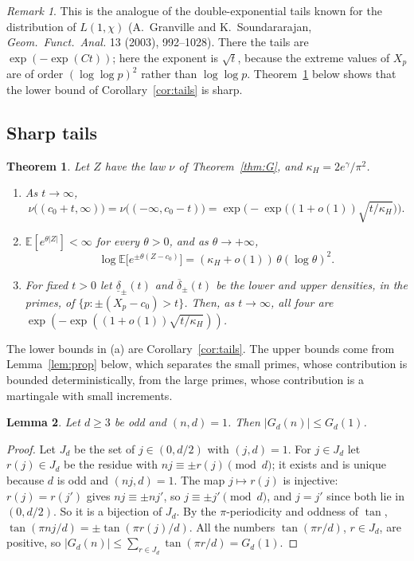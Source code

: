 \documentclass[11pt]{amsart}
\newtheorem{theorem}{Theorem}
\newtheorem{lemma}{Lemma}[section]
\theoremstyle{remark}
\newtheorem{remark}[lemma]{Remark}
\newcommand{\E}{\mathbb{E}}
\begin{document}
\begin{remark}
This is the analogue of the double-exponential tails known for the distribution of $L(1,\chi)$ (A.~Granville and K.~Soundararajan, \emph{Geom.\ Funct.\ Anal.} 13 (2003), 992--1028). There the tails are $\exp(-\exp(Ct))$; here the exponent is $\sqrt t$, because the extreme values of $X_p$ are of order $(\log\log p)^2$ rather than $\log\log p$. Theorem~\ref{thm:I} below shows that the lower bound of Corollary~\ref{cor:tails} is sharp.
\end{remark}

\subsection{Sharp tails}

\begin{theorem}\label{thm:I}
Let $Z$ have the law $\nu$ of Theorem~\ref{thm:G}, and $\kappa_H=2e^\gamma/\pi^2$.
\begin{enumerate}
\item[(a)] As $t\to\infty$,
\[
\nu\big((c_0+t,\infty)\big)=\nu\big((-\infty,c_0-t)\big)=\exp\Big(-\exp\big((1+o(1))\sqrt{t/\kappa_H}\big)\Big).
\]
\item[(b)] $\E[e^{\theta|Z|}]<\infty$ for every $\theta>0$, and as $\theta\to+\infty$,
\[
\log\E\big[e^{\pm\theta(Z-c_0)}\big]=(\kappa_H+o(1))\,\theta(\log\theta)^2 .
\]
\item[(c)] For fixed $t>0$ let $\underline\delta_\pm(t)$ and $\overline\delta_\pm(t)$ be the lower and upper densities, in the primes, of $\{p:\pm(X_p-c_0)>t\}$. Then, as $t\to\infty$, all four are $\exp(-\exp((1+o(1))\sqrt{t/\kappa_H}))$.
\end{enumerate}
\end{theorem}

The lower bounds in (a) are Corollary~\ref{cor:tails}. The upper bounds come from Lemma~\ref{lem:prop} below, which separates the small primes, whose contribution is bounded deterministically, from the large primes, whose contribution is a martingale with small increments.

\begin{lemma}\label{lem:Gmax}
Let $d\ge3$ be odd and $(n,d)=1$. Then $|G_d(n)|\le G_d(1)$.
\end{lemma}

\begin{proof}
Let $J_d$ be the set of $j\in(0,d/2)$ with $(j,d)=1$. For $j\in J_d$ let $r(j)\in J_d$ be the residue with $nj\equiv\pm r(j)\pmod d$; it exists and is unique because $d$ is odd and $(nj,d)=1$. The map $j\mapsto r(j)$ is injective: $r(j)=r(j')$ gives $nj\equiv\pm nj'$, so $j\equiv\pm j'\pmod d$, and $j=j'$ since both lie in $(0,d/2)$. So it is a bijection of $J_d$. By the $\pi$-periodicity and oddness of $\tan$, $\tan(\pi nj/d)=\pm\tan(\pi r(j)/d)$. All the numbers $\tan(\pi r/d)$, $r\in J_d$, are positive, so $|G_d(n)|\le\sum_{r\in J_d}\tan(\pi r/d)=G_d(1)$.
\end{proof}
\end{document}
